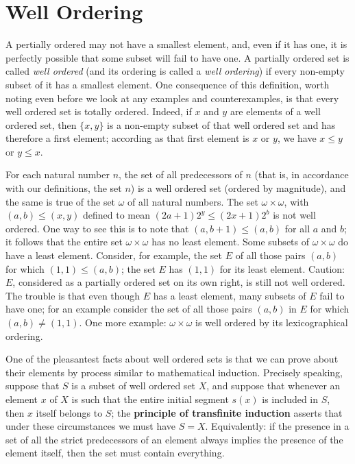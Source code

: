 
\chapter{Well Ordering}

A pertially ordered may not have a smallest element, and, even if it has one, it is perfectly possible that some subset will fail to have one. A partially ordered set is called \textit{well ordered} (and its ordering is called a \textit{well ordering}) if every non-empty subset of it has a smallest element. One consequence of this definition, worth noting even before we look at any examples and counterexamples, is that every well ordered set is totally ordered. Indeed, if $x$ and $y$ are elements of a well ordered set, then $\{ x,y \}$ is a non-empty subset of that well ordered set and has therefore a first element; according as that first element is $x$ or $y$, we have $x \le y$ or $y \le x$.

For each natural number $n$, the set of all predecessors of $n$ (that is, in accordance with our definitions, the set $n$) is a well ordered set (ordered by magnitude), and the same is true of the set $\omega$ of all natural numbers. The set $\omega \times \omega $, with $(a,b) \le (x,y)$ defined to mean $(2a + 1)2^{y} \le (2x + 1)2^{b}$ is not well ordered. One way to see this is to note that $(a,b + 1) \le (a,b)$ for all $a$ and $b$; it follows that the entire set $\omega \times \omega$ has no least element. Some subsets of $\omega \times \omega$ do have a least element. Consider, for example, the set $E$ of all those pairs $(a, b)$ for which $(1,1) \le (a,b)$; the set $E$ has $(1, 1)$ for its least element. Caution: $E$, considered as a partially ordered set on its own right, is still not well ordered. The trouble is that even though $E$ has a least element, many subsets of $E$ fail to have one; for an example consider the set of all those pairs $(a,b)$ in $E$ for which $(a,b) \neq (1, 1)$. One more example: $\omega \times \omega$ is well ordered by its lexicographical ordering. 

One of the pleasantest facts about well ordered sets is that we can prove about their elements by process similar to mathematical induction. Precisely speaking, suppose that $S$ is a subset of well ordered set $X$, and suppose that whenever an element $x$ of $X$ is such that the entire initial segment $s(x)$ is included in $S$, then $x$ itself belongs to $S$; the \textbf{principle of transfinite induction} asserts that under these circumstances we must have $S = X$. Equivalently: if the presence in a set of all the strict predecessors of an element always implies the presence of the element itself, then the set must contain everything. 

